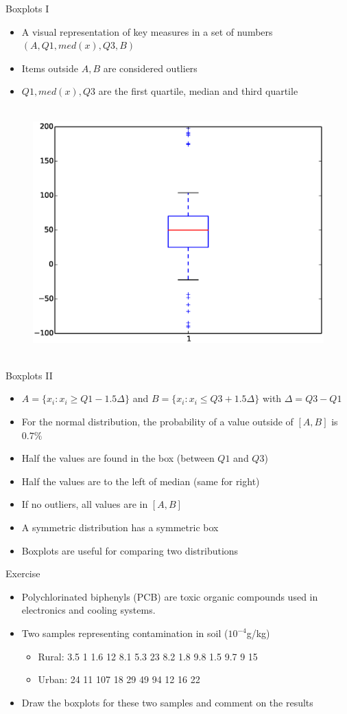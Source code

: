 \documentclass{beamer}
\begin{document}
\begin{frame}{Boxplots I} 
\begin{itemize} 
 \item A visual representation of key measures in a set of numbers $(A, Q1, med(x), Q3, B)$ 
 \item Items outside $A, B$ are considered outliers 
 \item $Q1, med(x), Q3$ are the first quartile, median and third quartile 
\end{itemize}
  \begin{figure}[htp]
\mbox{
\includegraphics[width=0.5\linewidth]{BoxPlot.eps}
}
\end{figure} 
\end{frame}

\begin{frame}{Boxplots II} 
\begin{itemize} 
 \item $A = \{x_i : x_i \geq Q1 - 1.5\Delta \}$ and $B = \{x_i : x_i \leq Q3 + 1.5\Delta \}$ with $\Delta = Q3 - Q1$
 \item For the normal distribution, the probability of a value outside of $[A, B]$ is $0.7\%$
 \item Half the values are found in the box (between $Q1$ and $Q3$) 
 \item Half the values are to the left of median (same for right)
 \item If no outliers, all values are in $[A, B]$
 \item A symmetric distribution has a symmetric box
 \item Boxplots are useful for comparing two distributions 
\end{itemize}
\end{frame}

\begin{frame}{Exercise}  
\begin{itemize} 
 \item Polychlorinated biphenyls (PCB) are toxic organic compounds used in electronics and cooling systems. 
 \item Two samples representing contamination in soil ($10^{-4}$g/kg)
 \begin{itemize}
 \item Rural: 3.5 1 1.6 12 8.1 5.3 23 8.2 1.8 9.8 1.5 9.7 9 15
 \item Urban: 24 11 107 18 29 49 94 12 16 22 
 \end{itemize}
 \item Draw the boxplots for these two samples and comment on the results
\end{itemize}
\end{frame}
\end{document}

